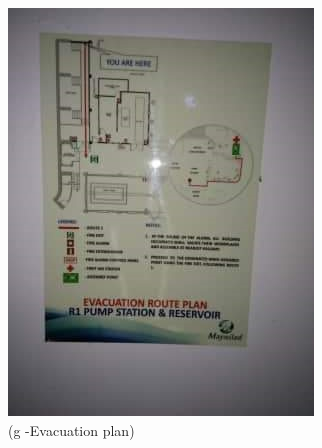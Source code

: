 \begin{figure}
\begin{minipage}[b]{0.22\linewidth}
	\includegraphics[width=\textwidth]{figures/R1P_safety/r1p_evacuation_plan.jpg}
	\caption*{(g -Evacuation plan)}
\end{minipage}
	\hspace{0.05cm}
\begin{minipage}[b]{0.22\linewidth}
	\centering

\end{minipage}
\end{figure}
